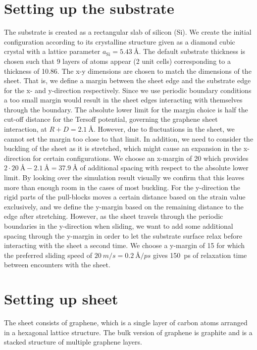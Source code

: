\section{Setting up the substrate}\label{sec:substrate}
The substrate is created as a rectangular slab of silicon (Si). We create the
initial configuration according to its crystalline structure given as a diamond
cubic crystal with a lattice parameter $a_{\text{Si}} = \SI{5.43}{\text{Å}}$.
The default substrate thickness is chosen such that 9 layers of atoms appear (2
unit cells) corresponding to a thickness of \SI{10.86}{}. The x-y
dimensions are chosen to match the dimensions of the sheet. That is, we define a
margin between the sheet edge and the substrate edge for the x- and y-direction
respectively. Since we use periodic boundary conditions a too small margin would
result in the sheet edges interacting with themselves through the boundary. The
absolute lower limit for the margin choice is half the cut-off distance for
the Tersoff potential, governing the graphene sheet interaction, at $R + D =
\SI{2.1}{\text{Å}}$. However, due to fluctuations in the sheet, we cannot set the margin too
close to that limit. In addition, we need to consider the buckling of the sheet as it is stretched, which might cause an expansion in the x-direction for certain configurations. We choose an x-margin of \SI{20}{} which provides $2\cdot
\SI{20}{\text{Å}} - \SI{2.1}{\text{Å}} = \SI{37.9}{\text{Å}}$ of additional
spacing with respect to the absolute lower limit. By looking over the simulation
result visually we confirm that this leaves more than enough room in the cases
of most buckling. For the y-direction the rigid parts of the pull-blocks
moves a certain distance based on the strain value exclusively, and we define
the y-margin based on the remaining distance to the edge after stretching.
However, as the sheet travels through the periodic boundaries in the y-direction
when sliding, we want to add some additional spacing through the y-margin in
order to let the substrate surface relax before interacting with the sheet a
second time. We choose a y-margin of \SI{15}{} for which the preferred sliding speed
of $\SI{20}{m/s} = \SI{0.2}{\text{Å}/ps}$ gives \SI{150}{ps} of relaxation time
between encounters with the sheet. 


\section{Setting up sheet}
The sheet consists of graphene, which is a single layer of carbon atoms arranged in a hexagonal lattice structure. The bulk version of graphene is graphite and is a stacked structure of multiple graphene layers. 

